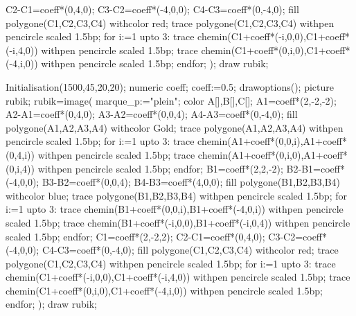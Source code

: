 \begin{debat}
\begin{center}
\begin{Geometrie}[CoinBG={u*(-10,-10)},TypeTrace="Espace"]
            C2-C1=coeff*(0,4,0);
            C3-C2=coeff*(-4,0,0);
            C4-C3=coeff*(0,-4,0);
            fill polygone(C1,C2,C3,C4) withcolor red;
            trace polygone(C1,C2,C3,C4) withpen pencircle scaled 1.5bp;
            for i:=1 upto 3:
                trace chemin(C1+coeff*(-i,0,0),C1+coeff*(-i,4,0)) withpen pencircle scaled 1.5bp;
                trace chemin(C1+coeff*(0,i,0),C1+coeff*(-4,i,0)) withpen pencircle scaled 1.5bp;
            endfor;
            );
            draw rubik;	
        \end{Geometrie}
        \begin{Geometrie}[CoinBG={u*(-10,-10)},TypeTrace="Espace"]
            Initialisation(1500,45,20,20);
            numeric coeff;
            coeff:=0.5;             
            drawoptions();
            picture rubik;
            rubik=image(
            marque_p:="plein";
            color A[],B[],C[];            
            A1=coeff*(2,-2,-2);
            A2-A1=coeff*(0,4,0);
            A3-A2=coeff*(0,0,4);
            A4-A3=coeff*(0,-4,0);
            fill polygone(A1,A2,A3,A4) withcolor Gold;
            trace polygone(A1,A2,A3,A4) withpen pencircle scaled 1.5bp;	
            for i:=1 upto 3:
                trace chemin(A1+coeff*(0,0,i),A1+coeff*(0,4,i)) withpen pencircle scaled 1.5bp;
                trace chemin(A1+coeff*(0,i,0),A1+coeff*(0,i,4)) withpen pencircle scaled 1.5bp;				
            endfor;	
            B1=coeff*(2,2,-2);
            B2-B1=coeff*(-4,0,0);
            B3-B2=coeff*(0,0,4);
            B4-B3=coeff*(4,0,0);
            fill polygone(B1,B2,B3,B4) withcolor blue;
            trace polygone(B1,B2,B3,B4) withpen pencircle scaled 1.5bp;
            for i:=1 upto 3:
                trace chemin(B1+coeff*(0,0,i),B1+coeff*(-4,0,i)) withpen pencircle scaled 1.5bp;
                trace chemin(B1+coeff*(-i,0,0),B1+coeff*(-i,0,4)) withpen pencircle scaled 1.5bp;
            endfor;	
            C1=coeff*(2,-2,2);
            C2-C1=coeff*(0,4,0);
            C3-C2=coeff*(-4,0,0);
            C4-C3=coeff*(0,-4,0);
            fill polygone(C1,C2,C3,C4) withcolor red;
            trace polygone(C1,C2,C3,C4) withpen pencircle scaled 1.5bp;
            for i:=1 upto 3:
                trace chemin(C1+coeff*(-i,0,0),C1+coeff*(-i,4,0)) withpen pencircle scaled 1.5bp;
                trace chemin(C1+coeff*(0,i,0),C1+coeff*(-4,i,0)) withpen pencircle scaled 1.5bp;
            endfor;
            );
            draw rubik;	
        \end{Geometrie}
        \begin{Geometrie}[CoinBG={u*(-10,-10)},TypeTrace="Espace"]

\end{Geometrie}
\end{center}
\end{debat}
